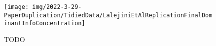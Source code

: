 \begin{figure}
    \centering
    \texttt{[image: img/2022-3-29-PaperDuplication/TidiedData/LalejiniEtAlReplicationFinalDominantInfoConcentration]}
    \caption{TODO} \label{fig:LalejiniEtAlReplicationFinalDominantInfoConcentration}
\end{figure}
